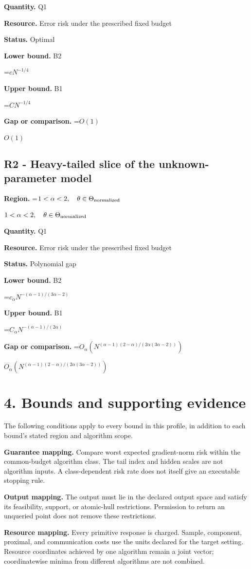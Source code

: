 \documentclass[10pt,a4paper]{article}
\newcommand{\AtlasMath}[1]{\par\begingroup\centering\setbox0=\hbox{$\displaystyle #1$}\ifdim\wd0>1.4\linewidth\typeout{ATLAS WIDE FORMULA: \the\wd0}\fi\ifdim\wd0>\linewidth\resizebox{\linewidth}{!}{\box0}\else\box0\fi\par\endgroup}
\newcommand{\AtlasInlineMath}[1]{\begingroup\setbox0=\hbox{$#1$}\ifdim\wd0>.4\linewidth\endgroup\AtlasMath{#1}\else\endgroup$#1$\fi}
\begin{document}
\textbf{Quantity.} Q1

\textbf{Resource.} Error risk under the prescribed fixed budget

\textbf{Status.} Optimal

\textbf{Lower bound.} B2

\AtlasMath{cN^{-1/4}}
\textbf{Upper bound.} B1

\AtlasMath{C N^{-1/4}}
\textbf{Gap or comparison.} \AtlasInlineMath{O(1)}

\subsection{R2 - Heavy-tailed slice of the unknown-parameter model}
\textbf{Region.} \AtlasInlineMath{1<\alpha<2,\quad\theta\in\Theta_{\rm normalized}}

\textbf{Quantity.} Q1

\textbf{Resource.} Error risk under the prescribed fixed budget

\textbf{Status.} Polynomial gap

\textbf{Lower bound.} B2

\AtlasMath{c_\alpha N^{-(\alpha-1)/(3\alpha-2)}}
\textbf{Upper bound.} B1

\AtlasMath{C_\alpha N^{-(\alpha-1)/(2\alpha)}}
\textbf{Gap or comparison.} \AtlasInlineMath{O_\alpha(N^{(\alpha-1)(2-\alpha)/(2\alpha(3\alpha-2))})}

\section{4. Bounds and supporting evidence}
The following conditions apply to every bound in this profile, in addition to each bound's stated region and algorithm scope.

\textbf{Guarantee mapping.} Compare worst expected gradient-norm risk within the common-budget algorithm class. The tail index and hidden scales are not algorithm inputs. A class-dependent risk rate does not itself give an executable stopping rule.

\textbf{Output mapping.} The output must lie in the declared output space and satisfy its feasibility, support, or atomic-hull restrictions. Permission to return an unqueried point does not remove these restrictions.

\textbf{Resource mapping.} Every primitive response is charged. Sample, component, proximal, and communication costs use the units declared for the target setting. Resource coordinates achieved by one algorithm remain a joint vector; coordinatewise minima from different algorithms are not combined.
\end{document}
